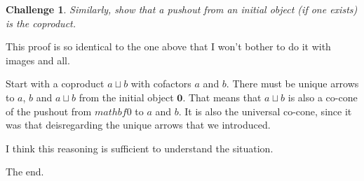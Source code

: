 \documentclass{article}
\theoremstyle{definition}
\newtheorem{ch}{Challenge}
\begin{document}
\begin{ch}\textit{Similarly, show that a pushout from an initial object (if one exists) is the coproduct.} 

This proof is so identical to the one above that I won't bother to do it with images and all.

Start with a coproduct $a \sqcup b$ with cofactors $a$ and $b$. There must be unique arrows to $a$, $b$ and $a \sqcup b$ from the initial object $\mathbf 0$. That means that $a \sqcup b$ is also a co-cone of the pushout from $mathbf 0$ to $a$ and $b$. It is also the universal co-cone, since it was that deisregarding the unique arrows that we introduced. 

I think this reasoning is sufficient to understand the situation.

The end.\end{ch}
\end{document}
